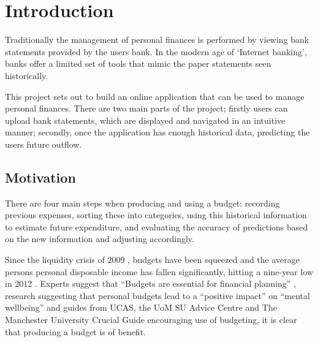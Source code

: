\chapter{Introduction}
\label{cha:introduction}

\begin{comment}
This chapter puts the work into context. Having read it, the reader should be left in no doubt as to:

- the topic area to which the work applies
- why the work is being done
- what else has been done in the area and by whom
 - how the author proposes to tackle the problem: The project proposal is often expressed in terms of a main objective and possibly one or more additional objectives. It is useful to define "milestones" or "sub-goals" that mark the progress towards the objectives. 
 - It is common to end this chapter with a brief overview of each of the subsequent chapters of the report.
\end{comment}
Traditionally the management of personal finances is performed by viewing bank statements provided by the users bank. In the modern age of `Internet banking', banks offer a limited set of tools that mimic the paper statements seen historically.

This project sets out to build an online application that can be used to manage personal finances. There are two main parts of the project; firstly users can upload bank statements, which are displayed and navigated in an intuitive manner; secondly, once the application has enough historical data, predicting the users future outflow.

\section{Motivation}
There are four main steps when producing and using a budget: recording previous expenses, sorting these into categories, using this historical information to estimate future expenditure, and evaluating the accuracy of predictions based on the new information and adjusting accordingly.

Since the liquidity crisis of 2009 \parencite{gore2010}, budgets have been squeezed and the average persons personal disposable income has fallen significantly, hitting a nine-year low in 2012 \parencite{barnard2012households}. Experts suggest that ``Budgets are essential for financial planning'' \parencite{wsj2013budget}, research suggesting that personal budgets lead to a ``positive impact'' on ``mental wellbeing'' \parencite{tlap2013budget} and guides from UCAS, the UoM SU Advice Centre and The Manchester University Crucial Guide encouraging use of budgeting, it is clear that producing a budget is of benefit.

